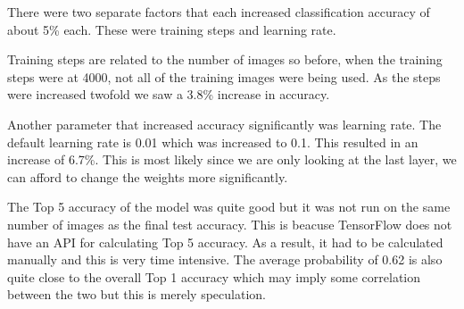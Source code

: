 There were two separate factors that each increased classification accuracy of
about 5\% each. These were training steps and learning rate.

Training steps are related to the number of images so before, when the training
steps were at 4000, not all of the training images were being used. As the steps were increased
twofold we saw a 3.8\% increase in accuracy.

Another parameter that increased accuracy significantly was learning rate. The
default learning rate is 0.01 which was increased to 0.1. This resulted in an
increase of 6.7\%. This is most likely since we are only
looking at the last layer, we can afford to change the weights more
significantly.

The Top 5 accuracy of the model was quite good but it was not run on the same number of images as the final test accuracy.
This is beacuse TensorFlow does not have an API for calculating Top 5 accuracy.
As a result, it had to be calculated manually and this is very time intensive.
The average probability of 0.62 is also quite close to the overall Top 1 accuracy which may imply some correlation between the two but this is merely speculation.
